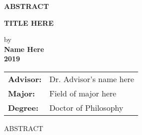 
\begin{center}
\textbf{ABSTRACT}
	
	
	\singlespacing
\textbf{TITLE HERE}\\
	\doublespacing
	
	by\\
	
	\textbf{Name Here}\\
	\textbf{2019}\\
\end{center}
\begin{tabular}{ll}	
\textbf{Advisor:} &Dr. Advisor's name here\\
\textbf{Major:}   &Field of major here\\
\textbf{Degree:}  &Doctor of Philosophy
\end{tabular}
\bigskip

ABSTRACT
